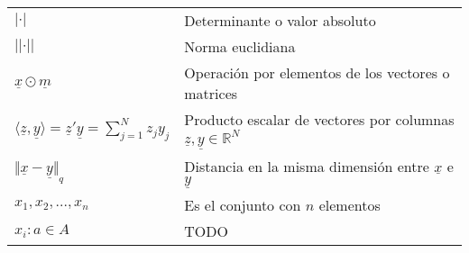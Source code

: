 \begin{table}[ht!]
\begin{center}
\begin{tabularx}{\textwidth}{|l|X|}
            $\lvert·\rvert$                                                                                                      & Determinante o valor absoluto                                                                                                                                               \\
            $\lvert\lvert·\rvert\rvert$                                                                                          & Norma euclidiana                                                                                                                                                            \\
            $\underline{x} \odot \underline{m}$                                                                                  & Operación por elementos de los vectores o matrices                                                                                                                          \\
            $\langle \underline{z}, \underline{y}\rangle  = \underline{z}' \underline{y} = \textstyle{\sum_{j=1}^{N}{z_j y_j}} $ & Producto escalar de vectores por columnas $\underline{z}, \underline{y} \in \mathbb{R}^{N}$                                                                                 \\
            ${\Vert \underline{x} - \underline{y} \Vert}_{q}$                                                                    & Distancia en la misma dimensión entre $\underline{x}$ e $\underline{y}$                                                                                                     \\\hline

            ${x_{1}, x_{2},...,x_{n}}$                                                                                           & Es el conjunto con $n$ elementos                                                                                                                                            \\\hline
            $x_{i}: a \in A$                                                                                                     & TODO                                                                                                                                                                        \\


\end{tabularx}
\end{center}
\end{table}
